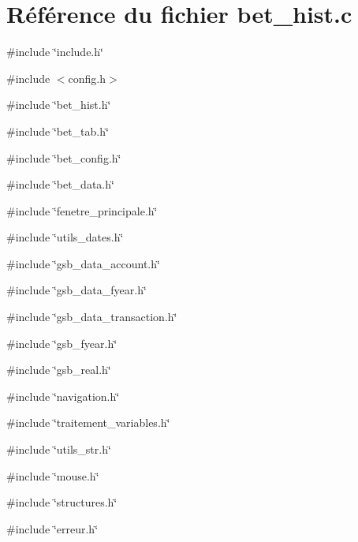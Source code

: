 \section{Référence du fichier bet\_\-hist.c}
\label{bet__hist_8c}
{\ttfamily \#include \char`\"{}include.h\char`\"{}}\par
{\ttfamily \#include $<$config.h$>$}\par
{\ttfamily \#include \char`\"{}bet\_\-hist.h\char`\"{}}\par
{\ttfamily \#include \char`\"{}bet\_\-tab.h\char`\"{}}\par
{\ttfamily \#include \char`\"{}bet\_\-config.h\char`\"{}}\par
{\ttfamily \#include \char`\"{}bet\_\-data.h\char`\"{}}\par
{\ttfamily \#include \char`\"{}fenetre\_\-principale.h\char`\"{}}\par
{\ttfamily \#include \char`\"{}utils\_\-dates.h\char`\"{}}\par
{\ttfamily \#include \char`\"{}gsb\_\-data\_\-account.h\char`\"{}}\par
{\ttfamily \#include \char`\"{}gsb\_\-data\_\-fyear.h\char`\"{}}\par
{\ttfamily \#include \char`\"{}gsb\_\-data\_\-transaction.h\char`\"{}}\par
{\ttfamily \#include \char`\"{}gsb\_\-fyear.h\char`\"{}}\par
{\ttfamily \#include \char`\"{}gsb\_\-real.h\char`\"{}}\par
{\ttfamily \#include \char`\"{}navigation.h\char`\"{}}\par
{\ttfamily \#include \char`\"{}traitement\_\-variables.h\char`\"{}}\par
{\ttfamily \#include \char`\"{}utils\_\-str.h\char`\"{}}\par
{\ttfamily \#include \char`\"{}mouse.h\char`\"{}}\par
{\ttfamily \#include \char`\"{}structures.h\char`\"{}}\par
{\ttfamily \#include \char`\"{}erreur.h\char`\"{}}\par
